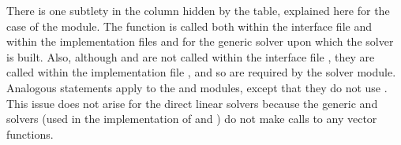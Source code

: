 There is one subtlety in the {\idaspils} column hidden by the table, explained
here for the case of the {\idaspgmr} module. 
The  function is called both within the interface file
 and within the implementation
files  and  for the generic
{\spgmr} solver upon which the {\idaspgmr} solver is built.  Also, although
 and  are not called within the interface file
, they are called within the implementation file
, and so are required by the {\idaspgmr} solver module.
Analogous statements apply to the {\idaspbcg} and {\idasptfqmr} modules,
except that they do not use .
This issue does not arise for the direct {\ida} linear solvers because
the generic {\dense} and {\band} solvers (used in the implementation of
{\idadense} and {\idaband}) do not make calls to any vector functions.

